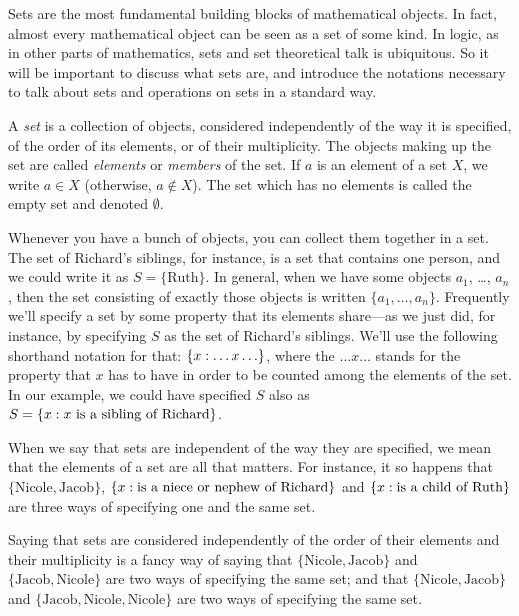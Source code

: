 \documentclass[../../../include/open-logic-section]{subfiles}
\begin{document}

\begin{explain}
Sets are the most fundamental building blocks of mathematical
objects. In fact, almost every mathematical object can be seen as a
set of some kind. In logic, as in other parts of mathematics, sets
and set theoretical talk is ubiquitous. So it will be important to
discuss what sets are, and introduce the notations necessary to talk
about sets and operations on sets in a standard way.
\end{explain}

\begin{defn}
A \emph{set} is a collection of objects, considered independently of
the way it is specified, of the order of its elements, or of their
multiplicity. The objects making up the set are called \emph{elements}
or \emph{members} of the set. If $a$ is an element of a set $X$, we
write $a \in X$ (otherwise, $a \notin X$). The set which has no elements
is called the empty set and denoted $\emptyset$.
\end{defn}

\begin{ex}
Whenever you have a bunch of objects, you can collect them together in
a set. The set of Richard's siblings, for instance, is a set that
contains one person, and we could write it as $S=\{\textrm{Ruth}\}$.
In general, when we have some objects $a_{1}$, \dots, $a_{n}$, then
the set consisting of exactly those objects is written $\{
a_{1}, \dots, a_{n}\}$. Frequently we'll specify a set by some
property that its elements share---as we just did, for instance, by
specifying $S$ as the set of Richard's siblings. We'll use the
following shorthand notation for that: $\{ x : \ldots x\ldots \}$,
where the $\ldots x\ldots$ stands for the property that $x$ has to
have in order to be counted among the elements of the set. In our
example, we could have specified $S$ also as $S = \{ x : x \text{ is
a sibling of Richard} \}$.
\end{ex}

\begin{explain}
When we say that sets are independent of the way they are specified,
we mean that the elements of a set are all that matters. For instance,
it so happens that $\{\text{Nicole}, \text{Jacob}\}$,
$\{ x : \text{is a niece or nephew of Richard} \}$ and
$\{ x : \text{is a child of Ruth} \}$ are three ways of specifying
one and the same set.

Saying that sets are considered independently of the order of their
elements and their multiplicity is a fancy way of saying that
$\{\text{Nicole}, \text{Jacob}\}$ and $\{\text{Jacob},
\text{Nicole}\}$ are two ways of specifying the same set; and that
$\{\text{Nicole}, \text{Jacob}\}$ and $\{\text{Jacob}, \text{Nicole},
\text{Nicole}\}$ are two ways of specifying the same set.
\end{explain}
\end{document}
